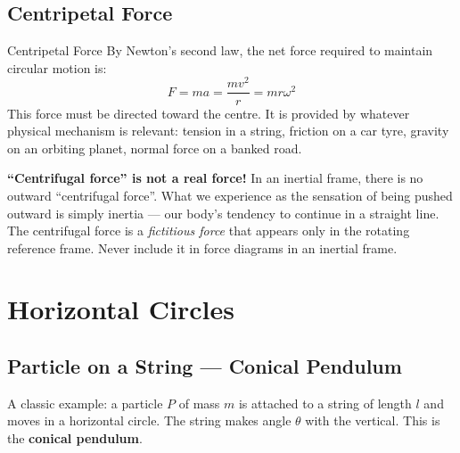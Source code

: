 \documentclass[12pt, a4paper]{book}
\begin{document}
\subsection{Centripetal Force}

\begin{defn}{Centripetal Force}{}
By Newton's second law, the net force required to maintain circular motion is:
\[
  F = ma = \frac{mv^2}{r} = mr\omega^2
\]
This force must be directed toward the centre. It is provided by whatever physical mechanism is relevant: tension in a string, friction on a car tyre, gravity on an orbiting planet, normal force on a banked road.
\end{defn}

\begin{warningbox}
\textbf{``Centrifugal force'' is not a real force!} In an inertial frame, there is no outward ``centrifugal force''. What we experience as the sensation of being pushed outward is simply inertia --- our body's tendency to continue in a straight line. The centrifugal force is a \emph{fictitious force} that appears only in the rotating reference frame. Never include it in force diagrams in an inertial frame.
\end{warningbox}

\section{Horizontal Circles}

\subsection{Particle on a String --- Conical Pendulum}

A classic example: a particle $P$ of mass $m$ is attached to a string of length $l$ and moves in a horizontal circle. The string makes angle $\theta$ with the vertical. This is the \textbf{conical pendulum}.

\begin{center}
\end{center}
\end{document}
